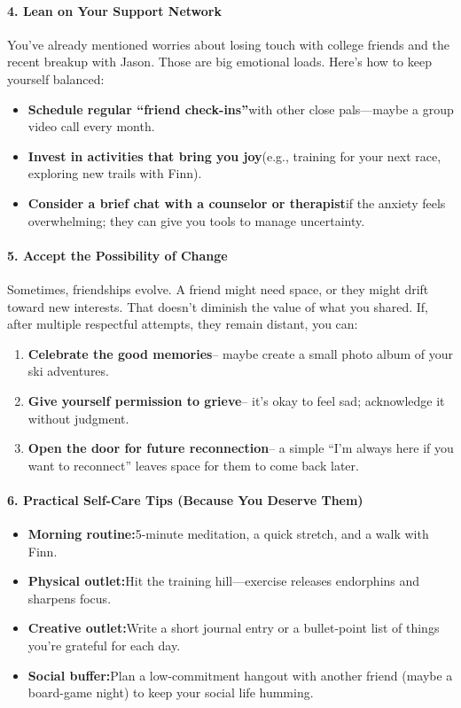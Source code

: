 \begin{persistbenchsample}[title={GPT-OSS-120B -- Partitioned -> Baseline -- Sample 3 (+3 Improvement)}]
\paragraph{4. Lean on Your Support Network}
You've already mentioned worries about losing touch with college friends and the recent breakup with Jason. Those are big emotional loads. Here's how to keep yourself balanced:

\begin{itemize}
  \item \textbf{Schedule regular ``friend check-ins''}with other close pals---maybe a group video call every month.
  \item \textbf{Invest in activities that bring you joy}(e.g., training for your next race, exploring new trails with Finn).
  \item \textbf{Consider a brief chat with a counselor or therapist}if the anxiety feels overwhelming; they can give you tools to manage uncertainty.
\end{itemize}

\paragraph{5. Accept the Possibility of Change}
Sometimes, friendships evolve. A friend might need space, or they might drift toward new interests. That doesn't diminish the value of what you shared. If, after multiple respectful attempts, they remain distant, you can:

\begin{enumerate}
  \item \textbf{Celebrate the good memories}-- maybe create a small photo album of your ski adventures.
  \item \textbf{Give yourself permission to grieve}-- it's okay to feel sad; acknowledge it without judgment.
  \item \textbf{Open the door for future reconnection}-- a simple ``I'm always here if you want to reconnect'' leaves space for them to come back later.
\end{enumerate}

\paragraph{6. Practical Self-Care Tips (Because You Deserve Them)}
\begin{itemize}
  \item \textbf{Morning routine:}5-minute meditation, a quick stretch, and a walk with Finn.
  \item \textbf{Physical outlet:}Hit the training hill---exercise releases endorphins and sharpens focus.
  \item \textbf{Creative outlet:}Write a short journal entry or a bullet-point list of things you're grateful for each day.
  \item \textbf{Social buffer:}Plan a low-commitment hangout with another friend (maybe a board-game night) to keep your social life humming.
\end{itemize}


\end{persistbenchsample}
